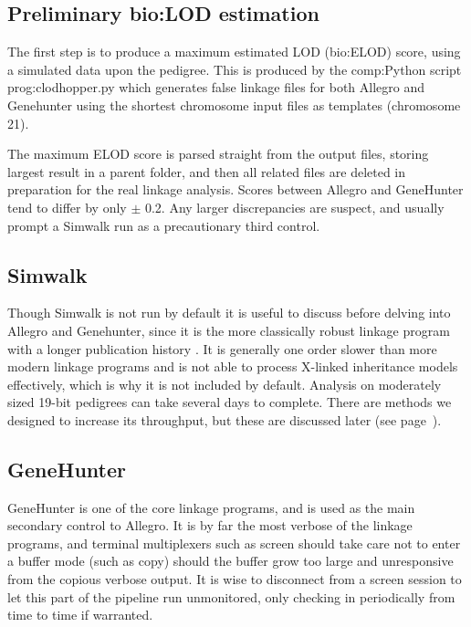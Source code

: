 \subsection{Preliminary \gls{bio:LOD} estimation}

The first step is to produce a maximum estimated LOD (\gls{bio:ELOD}) score, using a simulated data upon the pedigree. This is produced by the \gls{comp:Python} script \gls{prog:clodhopper.py} which generates false linkage files for both Allegro and Genehunter using the shortest chromosome input files as templates (chromosome 21).

The maximum ELOD score is parsed straight from the output files, storing largest result in a parent folder, and then all related files are deleted in preparation for the real linkage analysis. Scores between Allegro and GeneHunter tend to differ by only $\pm$ 0.2. Any larger discrepancies are suspect, and usually prompt a Simwalk run as a precautionary third control.

\subsection{Simwalk}

Though Simwalk is not run by default it is useful to discuss before delving into Allegro and Genehunter, since it is the more classically robust linkage program with a longer publication history \cite{simwalk}. It is generally one order slower than more modern linkage programs and is not able to process X-linked inheritance models effectively, which is why it is not included by default. Analysis on moderately sized 19-bit pedigrees can take several days to complete. There are methods we designed to increase its throughput, but these are discussed later (see page~\pageref{ref:meth:simwalkmulti}).


\subsection{GeneHunter}

GeneHunter is one of the core linkage programs, and is used as the main secondary control to Allegro. It is by far the most verbose of the linkage programs, and terminal multiplexers such as screen should take care not to enter a buffer mode (such as copy) should the buffer grow too large and unresponsive from the copious verbose output. It is wise to disconnect from a screen session to let this part of the pipeline run unmonitored, only checking in periodically from time to time if warranted.

